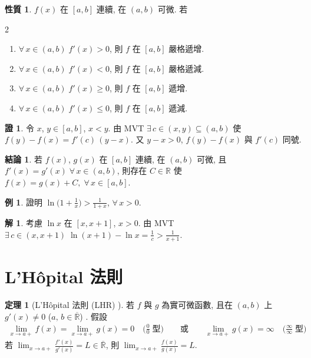 \documentclass[12pt]{extarticle}
\newcommand{\ds}{\displaystyle}
\theoremstyle{definition}
\newtheorem*{prp}{性質}
\newtheorem*{fact}{結論}
\newtheorem*{thm}{定理}
\newtheorem*{ex}{例}
\newtheorem*{sol}{解}
\newtheorem*{prf}{證}
\begin{document}
\begin{prp}
  $f(x)$ 在 $[a, b]$ 連續, 在 $(a, b)$ 可微. 若
  \begin{multicols}{2}
    \begin{enumerate}\setlength\itemsep{0em}
      \item $\ds\forall\,x\in(a, b)\; f'(x) > 0$, 則 $f$ 在 $[a, b]$ 嚴格遞增. 
      \item $\ds\forall\,x\in(a, b)\; f'(x) < 0$, 則 $f$ 在 $[a, b]$ 嚴格遞減. 
      \item $\ds\forall\,x\in(a, b)\; f'(x) \geqslant 0$, 則 $f$ 在 $[a, b]$ 遞增. 
      \item $\ds\forall\,x\in(a, b)\; f'(x) \leqslant 0$, 則 $f$ 在 $[a, b]$ 遞減. 
    \end{enumerate}
  \end{multicols}
\end{prp}

\begin{prf}
  令 $\ds x$, $y\in[a, b]$, $x < y$. 由 MVT $\ds\exists\,c\in(x, y)\subseteq(a, b)$ 使 $\ds f(y) - f(x) = f'(c)\,(y - x)$. 又 $y - x > 0$, $f(y) - f(x)$ 與 $f'(c)$ 同號.  
\end{prf}

\begin{fact}
  若 $f(x)$, $g(x)$ 在 $[a, b]$ 連續, 在 $(a, b)$ 可微, 且 $f'(x) = g'(x)\;\forall\,x\in(a, b)$, 則存在 $C\in\mathbb{R}$ 使 $f(x) = g(x) + C,\;\forall\,x\in[a, b]$. 
\end{fact}

\begin{ex}
  證明 $\ds\ln\big(1 + \frac{1}{x}\big) > \frac{1}{1 + x}$, $\forall\,x > 0$. 
\end{ex}

\begin{sol}
  考慮 $\ds\ln x$ 在 $\ds[x, x + 1]$, $\ds x > 0$. 由 MVT $\ds\exists\,c\in(x, x + 1)\;\ln(x + 1) - \ln x = \frac{1}{c} > \frac{1}{x + 1}$. 
\end{sol}

\section*{L'H\^opital 法則}

\begin{thm}[L'H\^opital 法則 (LHR) ]
  若 $f$ 與 $g$ 為實可微函數, 且在 $(a, b)$ 上 $g'(x)\ne 0$ ($a,\,b\in\overline{\mathbb{R}}$) . 假設 
  \begin{align*}
    \lim_{x\to a+}f(x) = \lim_{x\to a+}g(x) = 0\quad\Big(\frac{0}{0}\;\text{型}\Big)\qquad\text{或}\qquad\lim_{x\to a+}g(x) = \infty\quad\Big(\frac{\infty}{\infty}\;\text{型}\Big)
  \end{align*}
  若 $\ds\lim_{x\to a+}\frac{f'(x)}{g'(x)} = L\in\overline{\mathbb{R}}$, 則 $\ds\lim_{x\to a+}\frac{f(x)}{g(x)} = L$. 
\end{thm}
\end{document}

